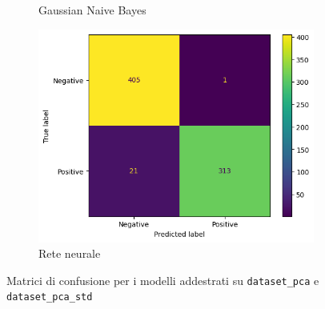 \begin{figure}[!ht]
\begin{subfigure}{.45\textwidth}
        \caption{Gaussian Naive Bayes}
        \label{fig:matrice_di_confusione_per_GNB_pca}
    \end{subfigure}
    \hfill
    \begin{subfigure}{.45\textwidth}
        \centering
        \includegraphics[width=\textwidth]{img/rete/matrice_confusione_PCA.png}
        \caption{Rete neurale}
        \label{fig:matrice_di_confusione_per_NN_pca}
    \end{subfigure}
    \caption{Matrici di confusione per i modelli addestrati su \texttt{dataset\_pca} e \texttt{dataset\_pca\_std}}
    \label{fig:matrice_di_confusione_per_pca}
\end{figure}

